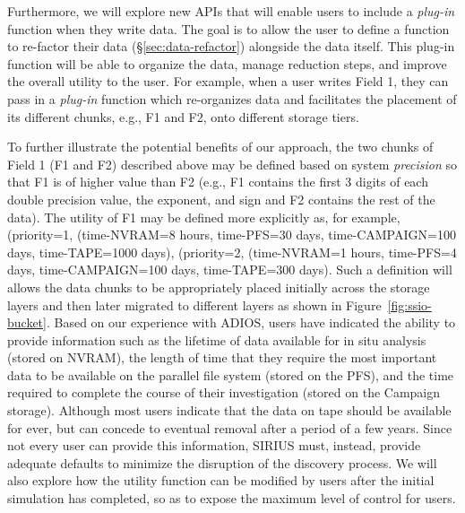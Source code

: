 Furthermore, we will explore new APIs that will enable users to include a {\it plug-in} function when 
they write data. The goal is to allow the user to define a function 
to re-factor their data (\S\ref{sec:data-refactor}) alongside the data
itself. This plug-in function will be able to organize the data, manage
reduction steps, and improve the overall utility to the user. 
For example, when a user writes Field 1, they can pass in a {\it plug-in} function 
which re-organizes data and facilitates the 
placement of its different chunks, e.g., F1 and F2,  onto different storage
tiers.

To further illustrate the potential benefits of our approach, the two chunks of Field 1 (F1 and F2) 
described above may be defined based on system {\it precision} so that F1 is of higher value 
than F2 (e.g., F1 contains the first 3 digits of each double precision value, the exponent, and 
sign and F2 contains the rest of the data). 
%
The utility of F1 may be defined more explicitly as, for example, 
(priority=1, (time-NVRAM=8 hours, time-PFS=30 days, time-CAMPAIGN=100 days, time-TAPE=1000 days), 
(priority=2, (time-NVRAM=1 hours, time-PFS=4 days, time-CAMPAIGN=100 days, time-TAPE=300 days).
Such a definition will allows the data chunks to be appropriately placed  initially across the storage layers 
and then later migrated to different layers as shown in Figure~\ref{fig:ssio-bucket}. 
Based on our experience with ADIOS, users
have indicated the ability to provide information such as the lifetime of
data available for in situ analysis (stored on NVRAM), the length of time
that they require the most important data to be available on the parallel
file system (stored on the PFS), and the time required to complete the
course of their investigation (stored on the Campaign storage). Although
most users indicate that the data on tape should be available for ever, but
can concede to eventual removal after a period of a few years. Since not
every user can provide this information, SIRIUS must, instead, provide
adequate defaults to minimize the disruption of the discovery process. We
will also explore how the utility function can be modified by users after
the initial simulation has completed, so as to expose the maximum level of
control for users. 

